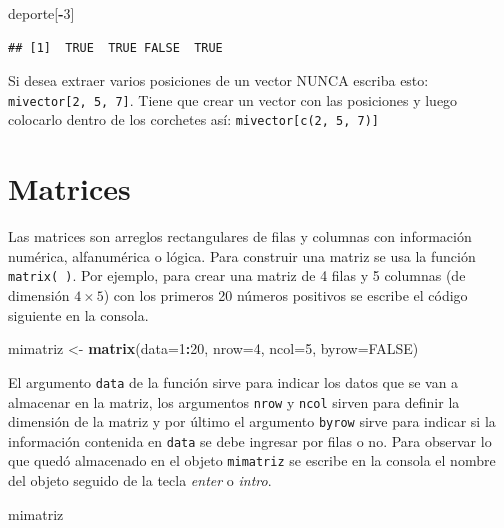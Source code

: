 \documentclass[10pt,]{krantz}
\makeatletter
\newenvironment{Shaded}{\begin{snugshade}}{\end{snugshade}}
\newcommand{\KeywordTok}[1]{\textcolor[rgb]{0.13,0.29,0.53}{\textbf{#1}}}
\newcommand{\DataTypeTok}[1]{\textcolor[rgb]{0.13,0.29,0.53}{#1}}
\newcommand{\DecValTok}[1]{\textcolor[rgb]{0.00,0.00,0.81}{#1}}
\newcommand{\StringTok}[1]{\textcolor[rgb]{0.31,0.60,0.02}{#1}}
\newcommand{\OtherTok}[1]{\textcolor[rgb]{0.56,0.35,0.01}{#1}}
\newcommand{\OperatorTok}[1]{\textcolor[rgb]{0.81,0.36,0.00}{\textbf{#1}}}
\newcommand{\NormalTok}[1]{#1}
\newenvironment{kframe}{%
\medskip{}
\setlength{\fboxsep}{.8em}
 \def\at@end@of@kframe{}%
 \ifinner\ifhmode%
  \def\at@end@of@kframe{\end{minipage}}%
  \begin{minipage}{\columnwidth}%
 \fi\fi%
 \def\FrameCommand##1{\hskip\@totalleftmargin \hskip-\fboxsep
 \colorbox{shadecolor}{##1}\hskip-\fboxsep
     \hskip-\linewidth \hskip-\@totalleftmargin \hskip\columnwidth}%
 \MakeFramed {\advance\hsize-\width
   \@totalleftmargin\z@ \linewidth\hsize
   \@setminipage}}%
 {\par\unskip\endMakeFramed%
 \at@end@of@kframe}
\renewenvironment{Shaded}{\begin{kframe}}{\end{kframe}}
\let\BeginKnitrBlock\begin \let\EndKnitrBlock\end
\makeatother
\begin{document}
\begin{Shaded}
\begin{Highlighting}[]
\NormalTok{deporte[}\OperatorTok{-}\DecValTok{3}\NormalTok{]}
\end{Highlighting}
\end{Shaded}

\begin{verbatim}
## [1]  TRUE  TRUE FALSE  TRUE
\end{verbatim}

\BeginKnitrBlock{rmdwarning}
Si desea extraer varios posiciones de un vector NUNCA escriba esto:
\texttt{mivector{[}2,\ 5,\ 7{]}}. Tiene que crear un vector con las
posiciones y luego colocarlo dentro de los corchetes así:
\texttt{mivector{[}c(2,\ 5,\ 7){]}}
\EndKnitrBlock{rmdwarning}

\section{Matrices}\label{matrices}

Las matrices  son arreglos rectangulares de filas y
columnas con información numérica, alfanumérica o lógica. Para construir
una matriz se usa la función \texttt{matrix(\ )}. Por ejemplo, para
crear una matriz de 4 filas y 5 columnas (de dimensión \(4 \times 5\))
con los primeros 20 números positivos se escribe el código siguiente en
la consola.

\begin{Shaded}
\begin{Highlighting}[]
\NormalTok{mimatriz <-}\StringTok{ }\KeywordTok{matrix}\NormalTok{(}\DataTypeTok{data=}\DecValTok{1}\OperatorTok{:}\DecValTok{20}\NormalTok{, }\DataTypeTok{nrow=}\DecValTok{4}\NormalTok{, }\DataTypeTok{ncol=}\DecValTok{5}\NormalTok{, }\DataTypeTok{byrow=}\OtherTok{FALSE}\NormalTok{)}
\end{Highlighting}
\end{Shaded}

El argumento \texttt{data} de la función sirve para indicar los datos
que se van a almacenar en la matriz, los argumentos \texttt{nrow} y
\texttt{ncol} sirven para definir la dimensión de la matriz y por último
el argumento \texttt{byrow} sirve para indicar si la información
contenida en \texttt{data} se debe ingresar por filas o no. Para
observar lo que quedó almacenado en el objeto \texttt{mimatriz} se
escribe en la consola el nombre del objeto seguido de la tecla
\textit{enter} o \textit{intro}.

\begin{Shaded}
\begin{Highlighting}[]
\NormalTok{mimatriz}
\end{Highlighting}
\end{Shaded}
\end{document}
